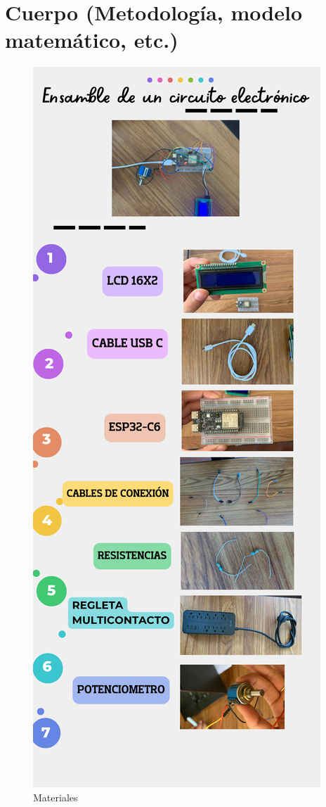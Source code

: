     \section{Cuerpo (Metodología, modelo matemático, etc.)}
    \begin{figure}[H]
        \centering
        \includegraphics[trim = {25mm 50mm 20mm 140mm},clip,scale=0.5]{16/Img/materialesCE.pdf}
        \caption{Materiales}
        \label{fig:Materiales}
    \end{figure}
